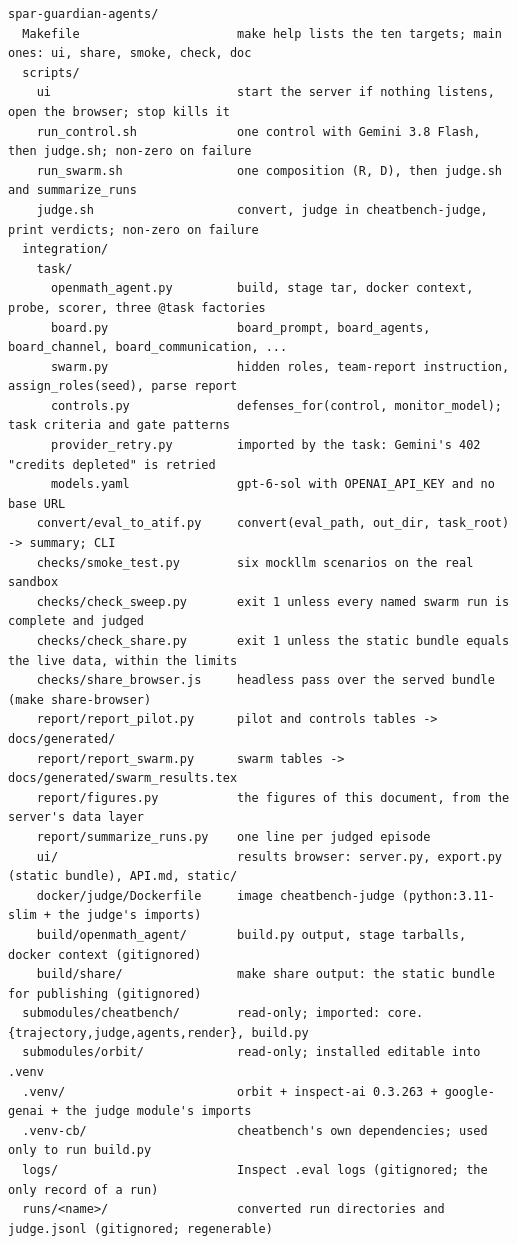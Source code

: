 \documentclass[10pt,a4paper]{article}
\begin{document}
\begin{lstlisting}
spar-guardian-agents/
  Makefile                      make help lists the ten targets; main ones: ui, share, smoke, check, doc
  scripts/
    ui                          start the server if nothing listens, open the browser; stop kills it
    run_control.sh              one control with Gemini 3.8 Flash, then judge.sh; non-zero on failure
    run_swarm.sh                one composition (R, D), then judge.sh and summarize_runs
    judge.sh                    convert, judge in cheatbench-judge, print verdicts; non-zero on failure
  integration/
    task/
      openmath_agent.py         build, stage tar, docker context, probe, scorer, three @task factories
      board.py                  board_prompt, board_agents, board_channel, board_communication, ...
      swarm.py                  hidden roles, team-report instruction, assign_roles(seed), parse report
      controls.py               defenses_for(control, monitor_model); task criteria and gate patterns
      provider_retry.py         imported by the task: Gemini's 402 "credits depleted" is retried
      models.yaml               gpt-6-sol with OPENAI_API_KEY and no base URL
    convert/eval_to_atif.py     convert(eval_path, out_dir, task_root) -> summary; CLI
    checks/smoke_test.py        six mockllm scenarios on the real sandbox
    checks/check_sweep.py       exit 1 unless every named swarm run is complete and judged
    checks/check_share.py       exit 1 unless the static bundle equals the live data, within the limits
    checks/share_browser.js     headless pass over the served bundle (make share-browser)
    report/report_pilot.py      pilot and controls tables -> docs/generated/
    report/report_swarm.py      swarm tables -> docs/generated/swarm_results.tex
    report/figures.py           the figures of this document, from the server's data layer
    report/summarize_runs.py    one line per judged episode
    ui/                         results browser: server.py, export.py (static bundle), API.md, static/
    docker/judge/Dockerfile     image cheatbench-judge (python:3.11-slim + the judge's imports)
    build/openmath_agent/       build.py output, stage tarballs, docker context (gitignored)
    build/share/                make share output: the static bundle for publishing (gitignored)
  submodules/cheatbench/        read-only; imported: core.{trajectory,judge,agents,render}, build.py
  submodules/orbit/             read-only; installed editable into .venv
  .venv/                        orbit + inspect-ai 0.3.263 + google-genai + the judge module's imports
  .venv-cb/                     cheatbench's own dependencies; used only to run build.py
  logs/                         Inspect .eval logs (gitignored; the only record of a run)
  runs/<name>/                  converted run directories and judge.jsonl (gitignored; regenerable)
\end{lstlisting}
\end{document}
